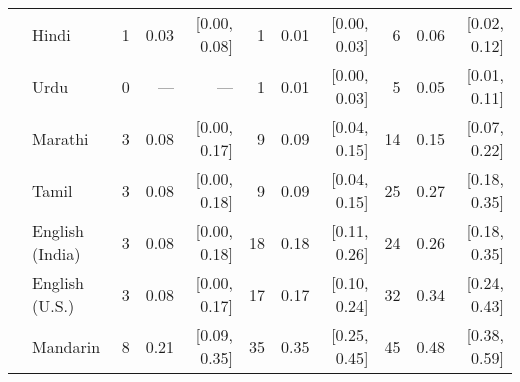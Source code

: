 \begin{table}[H]
\begin{footnotesize}
\begin{tabular}{p{.1in}lrrrrrrrrr}
 & Hindi & 1 & 0.03 & [0.00, 0.08] & 1 & 0.01 & [0.00, 0.03] & 6 & 0.06 & [0.02, 0.12]\\

 & Urdu & 0 & --- & --- & 1 & 0.01 & [0.00, 0.03] & 5 & 0.05 & [0.01, 0.11]\\

 & Marathi & 3 & 0.08 & [0.00, 0.17] & 9 & 0.09 & [0.04, 0.15] & 14 & 0.15 & [0.07, 0.22]\\

 & Tamil & 3 & 0.08 & [0.00, 0.18] & 9 & 0.09 & [0.04, 0.15] & 25 & 0.27 & [0.18, 0.35]\\

 & English (India) & 3 & 0.08 & [0.00, 0.18] & 18 & 0.18 & [0.11, 0.26] & 24 & 0.26 & [0.18, 0.35]\\

 & English (U.S.) & 3 & 0.08 & [0.00, 0.17] & 17 & 0.17 & [0.10, 0.24] & 32 & 0.34 & [0.24, 0.43]\\

& Mandarin & 8 & 0.21 & [0.09, 0.35] & 35 & 0.35 & [0.25, 0.45] & 45 & 0.48 & [0.38, 0.59]\\

\bottomrule
\end{tabular}
\end{footnotesize}
\end{table}